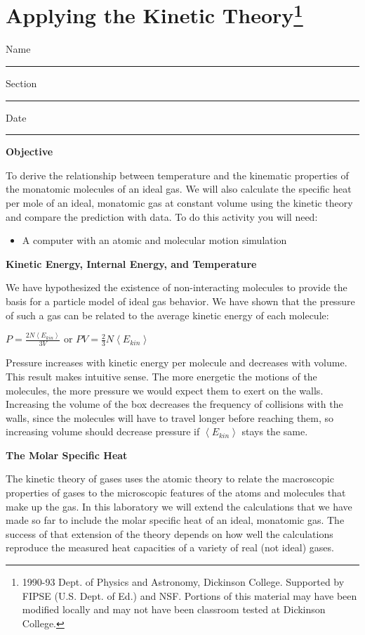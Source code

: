 
\section{Applying the Kinetic Theory\footnote{%
1990-93 Dept. of Physics and Astronomy, Dickinson College. Supported
by FIPSE (U.S. Dept. of Ed.) and NSF. Portions of this material may
have been modified locally and may not have been classroom tested
at Dickinson College.
}}

Name \rule{2.0in}{0.1pt}\hfill{}Section \rule{1.0in}{0.1pt}\hfill{}Date
\rule{1.0in}{0.1pt}

\textbf{Objective}

To derive the relationship between temperature and the kinematic properties
of the monatomic molecules of an ideal gas. We will also calculate
the specific heat per mole of an ideal, monatomic gas at constant
volume using the kinetic theory and compare the prediction with data.
To do this activity you will need:

\begin{itemize}
\item A computer with an atomic and molecular motion simulation
\end{itemize}

\textbf{Kinetic Energy, Internal Energy, and Temperature}

We have hypothesized the existence of non-interacting molecules to
provide the basis for a particle model of ideal gas behavior. We have
shown that the pressure of such a gas can be related to the average
kinetic energy of each molecule:

{\centering \( P=\frac{2N\left\langle E_{kin}\right\rangle }{3V} \)
or \( PV=\frac{2}{3}N\left\langle E_{kin}\right\rangle  \)\par}

Pressure increases with kinetic energy per molecule and decreases
with volume. This result makes intuitive sense. The more energetic
the motions of the molecules, the more pressure we would expect them
to exert on the walls. Increasing the volume of the box decreases
the frequency of collisions with the walls, since the molecules will
have to travel longer before reaching them, so increasing volume should
decrease pressure if \( \left\langle E_{kin}\right\rangle  \) stays
the same.

\textbf{The Molar Specific Heat}

The kinetic theory of gases uses the atomic theory to relate the macroscopic
properties of gases to the microscopic features of the atoms and molecules
that make up the gas. In this laboratory we will extend the calculations
that we have made so far to include the molar specific heat of an
ideal, monatomic gas. The success of that extension of the theory
depends on how well the calculations reproduce the measured heat capacities
of a variety of real (not ideal) gases.

